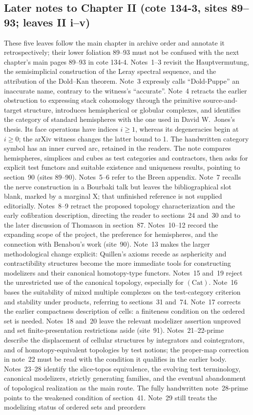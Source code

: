 \documentclass[10pt,oneside]{book}
\begin{document}
\subsection*{Later notes to Chapter II (cote 134-3, sites 89--93; leaves II i--v)}
These five leaves follow the main chapter in archive order and annotate it retrospectively; their lower foliation 89--93 must not be confused with the next chapter's main pages 89--93 in cote 134-4. Notes~1--3 revisit the Hauptvermutung, the semisimplicial construction of the Leray spectral sequence, and the attribution of the Dold--Kan theorem. Note~3 expressly calls ``Dold-Puppe'' an inaccurate name, contrary to the witness's ``accurate''. Note~4 retracts the earlier obstruction to expressing stack cohomology through the primitive source-and-target structure, introduces hemispherical or globular complexes, and identifies the category of standard hemispheres with the one used in David W.~Jones's thesis. Its face operations have indices $i\geq1$, whereas its degeneracies begin at $i\geq0$; the arXiv witness changes the latter bound to 1. The handwritten category symbol has an inner curved arc, retained in the readers. The note compares hemispheres, simplices and cubes as test categories and contractors, then asks for explicit test functors and suitable existence and uniqueness results, pointing to section~90 (sites 89--90). Notes~5--6 refer to the Breen appendix. Note~7 recalls the nerve construction in a Bourbaki talk but leaves the bibliographical slot blank, marked by a marginal X; that unfinished reference is not supplied editorially. Notes~8--9 retract the proposed topology characterization and the early cofibration description, directing the reader to sections~24 and~30 and to the later discussion of Thomason in section~87. Notes~10--12 record the expanding scope of the project, the preference for hemispheres, and the connection with Benabou's work (site~90). Note~13 makes the larger methodological change explicit: Quillen's axioms recede as asphericity and contractibility structures become the more immediate tools for constructing modelizers and their canonical homotopy-type functors. Notes~15 and~19 reject the unrestricted use of the canonical topology, especially for $(\mathrm{Cat})$. Note~16 bases the suitability of mixed multiple complexes on the test-category criterion and stability under products, referring to sections~31 and~74. Note~17 corrects the earlier compactness description of cells: a finiteness condition on the ordered set is needed. Notes~18 and~20 leave the relevant modelizer assertion unproved and set finite-presentation restrictions aside (site~91). Notes~21--22-prime describe the displacement of cellular structures by integrators and cointegrators, and of homotopy-equivalent topologies by test notions; the proper-map correction in note~22 must be read with the condition it qualifies in the earlier body. Notes~23--28 identify the slice-topos equivalence, the evolving test terminology, canonical modelizers, strictly generating families, and the eventual abandonment of topological realization as the main route. The fully handwritten note~28-prime points to the weakened condition of section~41. Note~29 still treats the modelizing status of ordered sets and preorders 
\end{document}
